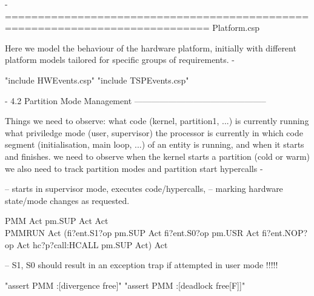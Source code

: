 {- =============================================================================
Platform.csp

 Here we model the behaviour of the hardware platform, initially with different
 platform models tailored for specific groups of requirements.
-}
\begin{assert}
"include HWEvents.csp"
\also "include TSPEvents.csp"
\end{assert}

{- 4.2 Partition Mode Management -----------------------------------------------

Things we need to observe:
  what code (kernel, partition1, ...) is currently running
  what priviledge mode (user, supervisor) the processor is currently in
  which code segment (initialisation, main loop, ...) of an entity is running,
    and when it starts and finishes.
  we need to observe when the kernel starts a partition (cold or warm)
  we also need to track partition modes and partition start hypercalls
-}

-- starts in supervisor mode, executes code/hypercalls,
-- marking hardware state/mode changes as requested.
\begin{circus}
\circprocess PMM \circdef \circbegin Act \circdef pm.SUP \then Act \circspot Act \circend\\

\circprocess PMMRUN \circdef
\circbegin
  Act \circdef (fi?ent.S1?op \then pm.SUP \then Act
   \extchoice
   fi?ent.S0?op \then pm.USR \then Act
   \extchoice
   fi?ent.NOP?op \then Act
   \extchoice
   hc?p?call:HCALL \then pm.SUP \then Act)
   \circspot Act
\circend
\end{circus}
-- S1, S0 should result in an exception trap if attempted in user mode !!!!!

\begin{assert}
"assert PMM :[divergence free]"
\also "assert PMM :[deadlock free[F]]"
\end{assert}
